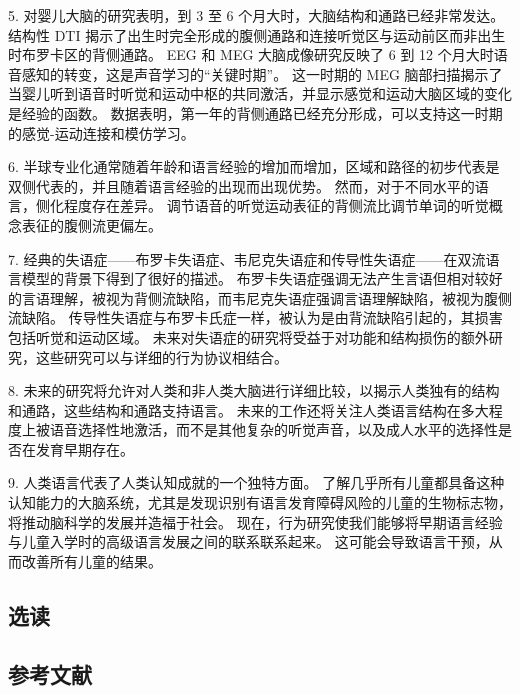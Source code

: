 5. 对婴儿大脑的研究表明，到 3 至 6 个月大时，大脑结构和通路已经非常发达。 结构性 DTI 揭示了出生时完全形成的腹侧通路和连接听觉区与运动前区而非出生时布罗卡区的背侧通路。 EEG 和 MEG 大脑成像研究反映了 6 到 12 个月大时语音感知的转变，这是声音学习的“关键时期”。 这一时期的 MEG 脑部扫描揭示了当婴儿听到语音时听觉和运动中枢的共同激活，并显示感觉和运动大脑区域的变化是经验的函数。 数据表明，第一年的背侧通路已经充分形成，可以支持这一时期的感觉-运动连接和模仿学习。

6. 半球专业化通常随着年龄和语言经验的增加而增加，区域和路径的初步代表是双侧代表的，并且随着语言经验的出现而出现优势。 然而，对于不同水平的语言，侧化程度存在差异。 调节语音的听觉运动表征的背侧流比调节单词的听觉概念表征的腹侧流更偏左。 

7. 经典的失语症——布罗卡失语症、韦尼克失语症和传导性失语症——在双流语言模型的背景下得到了很好的描述。 布罗卡失语症强调无法产生言语但相对较好的言语理解，被视为背侧流缺陷，而韦尼克失语症强调言语理解缺陷，被视为腹侧流缺陷。 传导性失语症与布罗卡氏症一样，被认为是由背流缺陷引起的，其损害包括听觉和运动区域。 未来对失语症的研究将受益于对功能和结构损伤的额外研究，这些研究可以与详细的行为协议相结合。 

8. 未来的研究将允许对人类和非人类大脑进行详细比较，以揭示人类独有的结构和通路，这些结构和通路支持语言。 未来的工作还将关注人类语言结构在多大程度上被语音选择性地激活，而不是其他复杂的听觉声音，以及成人水平的选择性是否在发育早期存在。 

9. 人类语言代表了人类认知成就的一个独特方面。 了解几乎所有儿童都具备这种认知能力的大脑系统，尤其是发现识别有语言发育障碍风险的儿童的生物标志物，将推动脑科学的发展并造福于社会。 现在，行为研究使我们能够将早期语言经验与儿童入学时的高级语言发展之间的联系联系起来。 这可能会导致语言干预，从而改善所有儿童的结果。

\subsection{选读}
\subsection{参考文献}

